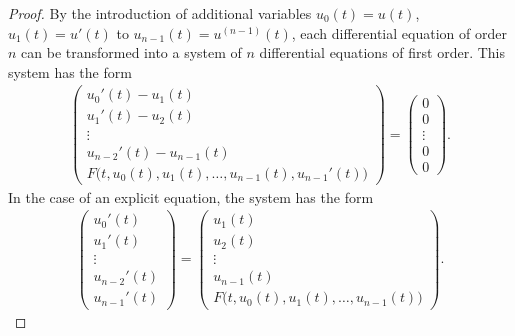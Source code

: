 \begin{proof}
  By the introduction of additional variables $u_0(t) = u(t)$, $u_1(t)
  = u'(t)$ to $u_{n-1}(t) = u^{(n-1)}(t)$, each differential equation of
  order $n$ can be transformed into a system of $n$ differential equations
  of first order. This system has the form
  \begin{gather}
    \label{eq:awa:13}
    \begin{pmatrix}
      u_0'(t) - u_1(t) \\
      u_1'(t) - u_2(t) \\
      \vdots\\
      u_{n-2}'(t) - u_{n-1}(t) \\
      F\bigl(t, u_0(t),u_1(t),\dots,u_{n-1}(t), u_{n-1}'(t)\bigr)
    \end{pmatrix}
    =
    \begin{pmatrix}
      0\\0\\\vdots\\0\\0
    \end{pmatrix}.
  \end{gather}
  In the case of an explicit equation, the system has the form
  \begin{gather}
    \label{eq:awa:13a}
    \begin{pmatrix}
      u_0'(t) \\
      u_1'(t) \\
      \vdots\\
      u_{n-2}'(t) \\
      u_{n-1}' (t)
    \end{pmatrix}
    =
    \begin{pmatrix}
      u_1(t)\\u_2(t)\\\vdots\\u_{n-1}(t)\\F\bigl(t, u_0(t),u_1(t),\dots,u_{n-1}(t)\bigr)
    \end{pmatrix}.
  \end{gather}
\end{proof}


